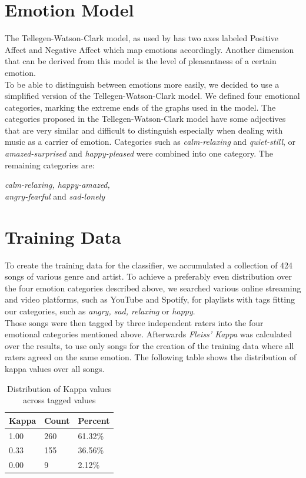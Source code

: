 \documentclass{sigchi-ext}
\begin{document}
\section{Emotion Model}\label{sec:emotion-model}
The Tellegen-Watson-Clark model, as used by \cite{Trohidis2011} has two axes labeled Positive Affect and Negative Affect which map emotions accordingly. Another dimension that can be derived from this model is the level of pleasantness of a certain emotion.\\
To be able to distinguish between emotions more easily, we decided to use a simplified version of the Tellegen-Watson-Clark model. We defined four emotional categories, marking the extreme ends of the graphs used in the model. The categories proposed in the Tellegen-Watson-Clark model have some adjectives that are very similar and difficult to distinguish especially when dealing with music as a carrier of emotion. Categories such as \textit{calm-relaxing} and \textit{quiet-still}, or \textit{amazed-surprised} and \textit{happy-pleased} were combined into one category. The remaining categories are: 

\begin{center}
\textit{calm-relaxing, happy-amazed,\\ angry-fearful} and \textit{sad-lonely}
\end{center}

\section{Training Data}\label{training-data}
To create the training data for the classifier, we accumulated a collection of 424 songs of various genre and artist. To achieve a preferably even distribution over the four emotion categories described above, we searched various online streaming and video platforms, such as YouTube and Spotify, for playlists with tags fitting our categories, such as \textit{angry, sad, relaxing} or \textit{happy}.\\
Those songs were then tagged by three independent raters into the four emotional categories mentioned above. Afterwards \textit{Fleiss' Kappa} was calculated over the results, to use only songs for the creation of the training data where all raters agreed on the same emotion. The following table shows the distribution of kappa values over all songs.\\

\begin{table}
  \centering
  \label{fig:kappa-distribution}
  \begin{tabular}{@{}lll@{}}
    Kappa & Count & Percent \\ \midrule
    1.00 & 260 & 61.32\% \\
    0.33 & 155 & 36.56\% \\
    0.00 & 9 	 & 2.12\%
  \end{tabular}
  \caption{Distribution of Kappa values across tagged values}
\end{table}
\end{document}
